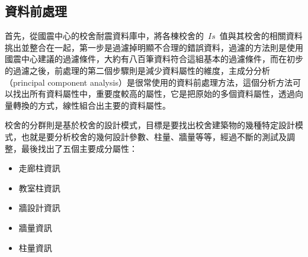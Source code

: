 
\subsection{資料前處理}

首先，從國震中心的校舍耐震資料庫中，將各棟校舍的~$Is$~值與其校舍的相關資料挑出並整合在一起，第一步是過濾掉明顯不合理的錯誤資料，過濾的方法則是使用國震中心建議的過濾條件，大約有八百筆資料符合這組基本的過濾條件，而在初步的過濾之後，前處理的第二個步驟則是減少資料屬性的維度，主成分分析（principal component analysis）是很常使用的資料前處理方法，這個分析方法可以找出所有資料屬性中，重要度較高的屬性，它是把原始的多個資料屬性，透過向量轉換的方式，線性組合出主要的資料屬性。


校舍的分群則是基於校舍的設計模式，目標是要找出校舍建築物的幾種特定設計模式，也就是要分析校舍的幾何設計參數、柱量、牆量等等，經過不斷的測試及調整，最後找出了五個主要成分屬性：

\begin{itemize}
\item 走廊柱資訊
\item 教室柱資訊
\item 牆設計資訊
\item 牆量資訊
\item 柱量資訊
\end{itemize}

